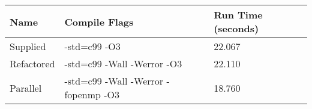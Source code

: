 \documentclass[a4paper,12pt,openany]{report}
\begin{document}
\begin{tabular}{ | l | l | l | }
	\hline
	\textbf{Name} & \textbf{Compile Flags} & \textbf{Run Time (seconds)} \\ \hline
	Supplied & -std=c99 -O3 & 22.067 \\ \hline
	Refactored & -std=c99 -Wall -Werror -O3 & 22.110 \\ \hline
	Parallel & -std=c99 -Wall -Werror -fopenmp -O3 & 18.760 \\ \hline
\end{tabular}


\end{document}
